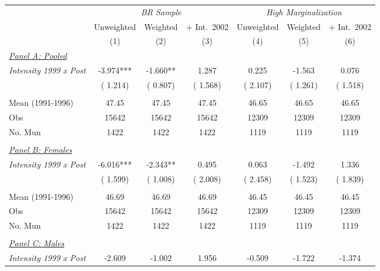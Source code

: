 \begin{tabular}{lcccccc} \hline \hline
& \multicolumn{3}{c}{\textit{BR Sample}} & \multicolumn{3}{c}{\textit{High Marginalization}} \\ \cmidrule(lr){2-4}\cmidrule(lr){5-7}
& \multicolumn{1}{c}{Unweighted} & \multicolumn{1}{c}{Weighted} & \multicolumn{1}{c}{+ Int.\ 2002} & \multicolumn{1}{c}{Unweighted} & \multicolumn{1}{c}{Weighted} & \multicolumn{1}{c}{+ Int.\ 2002} \\ 
\cmidrule(lr){2-2}\cmidrule(lr){3-3}\cmidrule(lr){4-4}\cmidrule(lr){5-5}\cmidrule(lr){6-6}\cmidrule(lr){7-7}
& \multicolumn{1}{c}{(1)} & \multicolumn{1}{c}{(2)} & \multicolumn{1}{c}{(3)} & \multicolumn{1}{c}{(4)} & \multicolumn{1}{c}{(5)} & \multicolumn{1}{c}{(6)} \\ \toprule
\underline{\textit{Panel A: Pooled}} \\ 
\textit{Intensity 1999 x Post}&    -3.974***&    -1.660**&     1.287&     0.225&    -1.563&     0.076 \\ 
 & (    1.214)& (    0.807)& (    1.568)& (    2.107)& (    1.261)& (    1.518) \\ 
  & & & & & & \\ 
Mean (1991-1996)&     47.45&     47.45&     47.45&     46.65&     46.65&     46.65 \\ 
Obs&     15642&     15642&     15642&     12309&     12309&     12309 \\ 
No. Mun&      1422&      1422&      1422&      1119&      1119&      1119 \\ 
  & & & & & & \\ 
\underline{\textit{Panel B: Females}} \\ 
\textit{Intensity 1999 x Post}&    -6.016***&    -2.343**&     0.495&     0.063&    -1.492&     1.336 \\ 
 & (    1.599)& (    1.008)& (    2.008)& (    2.458)& (    1.523)& (    1.839) \\ 
  & & & & & & \\ 
Mean (1991-1996)&     46.69&     46.69&     46.69&     46.45&     46.45&     46.45 \\ 
Obs&     15642&     15642&     15642&     12309&     12309&     12309 \\ 
No. Mun&      1422&      1422&      1422&      1119&      1119&      1119 \\ 
  & & & & & & \\ 
\underline{\textit{Panel C: Males}} \\ 
\textit{Intensity 1999 x Post}&    -2.609&    -1.002&     1.956&    -0.509&    -1.722&    -1.374 \\ 

\end{tabular}

